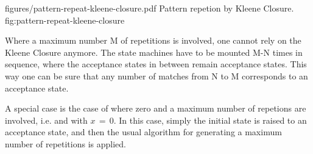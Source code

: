 \showpic
{figures/pattern-repeat-kleene-closure.pdf}
{Pattern repetion by Kleene Closure.}
{fig:pattern-repeat-kleene-closure}

Where a maximum number M of repetitions is involved, one cannot rely on the Kleene
Closure anymore. The state machines have to be mounted M-N times in sequence, where
the acceptance states in between remain acceptance states. This way one can be 
sure that any number of matches from N to M corresponds to an acceptance state.

A special case is the case of where zero and a maximum number of repetions are
involved, i.e.   and  with $x\,=\,0$. 
In this case, simply the initial state is raised to an acceptance state, and then
the usual algorithm for generating a maximum number of repetitions is applied.

